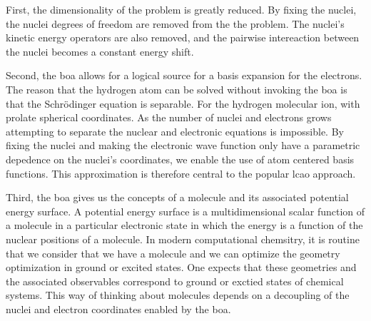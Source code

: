 First, the dimensionality of the problem is greatly reduced.
By fixing the nuclei, the nuclei degrees of freedom are removed from the the problem.
The nuclei's kinetic energy operators are also removed, and the pairwise intereaction between the nuclei becomes a constant energy shift.

Second, the \gls{boa} allows for a logical source for a basis expansion for the electrons.
The reason that the hydrogen atom can be solved without invoking the \gls{boa} is that the Schr{\"o}dinger equation is separable.
For the hydrogen molecular ion, with prolate spherical coordinates.\cite{10.1088/0370-1328/71/5/312}
As the number of nuclei and electrons grows attempting to separate the nuclear and electronic equations is impossible.
By fixing the nuclei and making the electronic wave function only have a parametric depedence on the nuclei's coordinates, we enable the use of atom centered basis functions.
This approximation is therefore central to the popular \gls{lcao} approach.

Third, the \gls{boa} gives us the concepts of a molecule and its associated potential energy surface.
A potential energy surface is a multidimensional scalar function of a molecule in a particular electronic state in which the energy is a function of the nuclear positions of a molecule.
In modern computational chemsitry, it is routine that we consider that we have a molecule and we can optimize the geometry optimization in ground or excited states.
One expects that these geometries and the associated observables correspond to ground or exctied states of chemical systems.
This way of thinking about molecules depends on a decoupling of the nuclei and electron coordinates enabled by the \gls{boa}.
